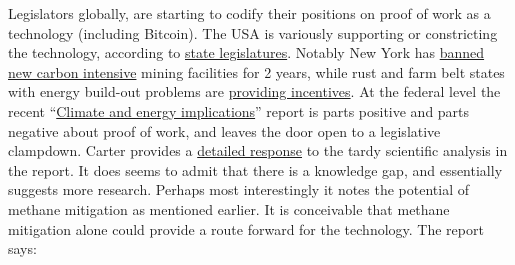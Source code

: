 Legislators globally, are starting to codify their positions on proof of work as a technology (including Bitcoin). The USA is variously supporting or constricting the technology, according to \href{https://www.ncsl.org/research/financial-services-and-commerce/cryptocurrency-2021-legislation.aspx}{state legislatures}. Notably New York has \href{https://www.nysenate.gov/legislation/bills/2021/A7389}{banned new carbon intensive} mining facilities for 2 years, while rust and farm belt states with energy build-out problems are \href{https://financialpost.com/fp-finance/cryptocurrency/texas-governor-abbott-turns-to-bitcoin-miners-to-bolster-the-grid-and-his-re-election}{providing incentives}. At the federal level the recent ``\href{https://www.whitehouse.gov/ostp/news-updates/2022/09/08/fact-sheet-climate-and-energy-implications-of-crypto-assets-in-the-united-states/}{Climate and energy implications}'' report is parts positive and parts negative about proof of work, and leaves the door open to a legislative clampdown. Carter provides a \href{https://medium.com/@nic__carter/comments-on-the-white-house-report-on-the-climate-implications-of-crypto-mining-8d65d30ec942}{detailed response} to the tardy scientific analysis in the report. It does seems to admit that there is a knowledge gap, and essentially suggests more research. Perhaps most interestingly it notes the potential of methane mitigation as mentioned earlier. It is conceivable that methane mitigation alone could provide a route forward for the technology. The report says:
